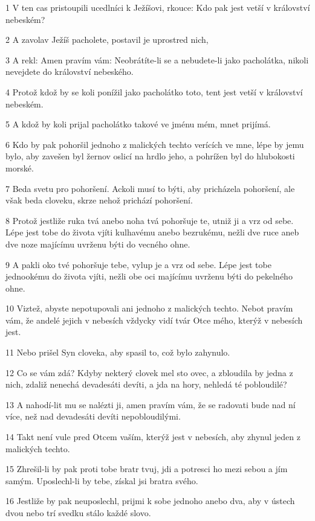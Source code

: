 \par 1 V ten cas pristoupili ucedlníci k Ježíšovi, rkouce: Kdo pak jest vetší v království nebeském?
\par 2 A zavolav Ježíš pacholete, postavil je uprostred nich,
\par 3 A rekl: Amen pravím vám: Neobrátíte-li se a nebudete-li jako pacholátka, nikoli nevejdete do království nebeského.
\par 4 Protož kdož by se koli ponížil jako pacholátko toto, tent jest vetší v království nebeském.
\par 5 A kdož by koli prijal pacholátko takové ve jménu mém, mnet prijímá.
\par 6 Kdo by pak pohoršil jednoho z malických techto verících ve mne, lépe by jemu bylo, aby zavešen byl žernov oslicí na hrdlo jeho, a pohrížen byl do hlubokosti morské.
\par 7 Beda svetu pro pohoršení. Ackoli musí to býti, aby pricházela pohoršení, ale však beda cloveku, skrze nehož prichází pohoršení.
\par 8 Protož jestliže ruka tvá anebo noha tvá pohoršuje te, utniž ji a vrz od sebe. Lépe jest tobe do života vjíti kulhavému anebo bezrukému, nežli dve ruce aneb dve noze majícímu uvrženu býti do vecného ohne.
\par 9 A pakli oko tvé pohoršuje tebe, vylup je a vrz od sebe. Lépe jest tobe jednookému do života vjíti, nežli obe oci majícímu uvrženu býti do pekelného ohne.
\par 10 Viztež, abyste nepotupovali ani jednoho z malických techto. Nebot pravím vám, že andelé jejich v nebesích vždycky vidí tvár Otce mého, kterýž v nebesích jest.
\par 11 Nebo prišel Syn cloveka, aby spasil to, což bylo zahynulo.
\par 12 Co se vám zdá? Kdyby nekterý clovek mel sto ovec, a zbloudila by jedna z nich, zdaliž nenechá devadesáti devíti, a jda na hory, nehledá té pobloudilé?
\par 13 A nahodí-lit mu se nalézti ji, amen pravím vám, že se radovati bude nad ní více, než nad devadesáti devíti nepobloudilými.
\par 14 Takt není vule pred Otcem vaším, kterýž jest v nebesích, aby zhynul jeden z malických techto.
\par 15 Zhrešil-li by pak proti tobe bratr tvuj, jdi a potresci ho mezi sebou a jím samým. Uposlechl-li by tebe, získal jsi bratra svého.
\par 16 Jestliže by pak neuposlechl, prijmi k sobe jednoho anebo dva, aby v ústech dvou nebo trí svedku stálo každé slovo.
